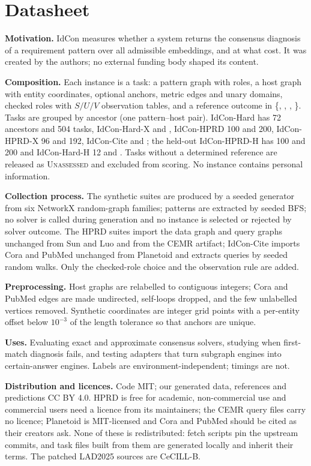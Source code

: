 \section{Datasheet}
\label{app:datasheet}
\textbf{Motivation.} IdCon measures whether a system returns the consensus diagnosis of a requirement pattern over all admissible embeddings, and at what cost. It was created by the authors; no external funding body shaped its content.

\textbf{Composition.} Each instance is a task: a pattern graph with roles, a host graph with entity coordinates, optional anchors, metric edges and unary domains, checked roles with $S/U/V$ observation tables, and a reference outcome in \{\Sat, \Vio, \Unk, \Emp\}. Tasks are grouped by ancestor (one pattern--host pair). IdCon-Hard has 72 ancestors and 504 tasks, IdCon-Hard-X \hardxAncestors{} and \hardxTasks{}, IdCon-HPRD 100 and 200, IdCon-HPRD-X 96 and 192, IdCon-Cite \citeAncestors{} and \citeTasks{}; the held-out IdCon-HPRD-H has 100 and 200 and IdCon-Hard-H 12 and \hardhTasks{}. Tasks without a determined reference are released as \textsc{Unassessed} and excluded from scoring. No instance contains personal information.

\textbf{Collection process.} The synthetic suites are produced by a seeded generator from six NetworkX random-graph families; patterns are extracted by seeded BFS; no solver is called during generation and no instance is selected or rejected by solver outcome. The HPRD suites import the data graph and query graphs unchanged from Sun and Luo and from the CEMR artifact; IdCon-Cite imports Cora and PubMed unchanged from Planetoid and extracts queries by seeded random walks. Only the checked-role choice and the observation rule are added.

\textbf{Preprocessing.} Host graphs are relabelled to contiguous integers; Cora and PubMed edges are made undirected, self-loops dropped, and the few unlabelled vertices removed. Synthetic coordinates are integer grid points with a per-entity offset below $10^{-3}$ of the length tolerance so that anchors are unique.

\textbf{Uses.} Evaluating exact and approximate consensus solvers, studying when first-match diagnosis fails, and testing adapters that turn subgraph engines into certain-answer engines. Labels are environment-independent; timings are not.

\textbf{Distribution and licences.} Code MIT; our generated data, references and predictions CC BY 4.0. HPRD is free for academic, non-commercial use and commercial users need a licence from its maintainers; the CEMR query files carry no licence; Planetoid is MIT-licensed and Cora and PubMed should be cited as their creators ask. None of these is redistributed: fetch scripts pin the upstream commits, and task files built from them are generated locally and inherit their terms. The patched LAD2025 sources are CeCILL-B.

